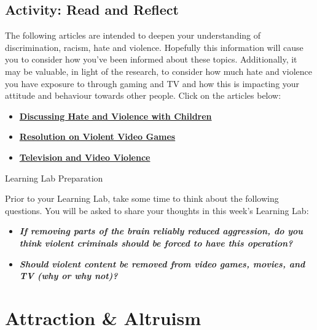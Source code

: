 \documentclass[
]{book}
\providecommand{\tightlist}{%
  \setlength{\itemsep}{0pt}\setlength{\parskip}{0pt}}
\begin{document}
\hypertarget{activity-read-and-reflect-9}{%
\subsection*{Activity: Read and Reflect}\label{activity-read-and-reflect-9}}

\begin{reflect}
The following articles are intended to deepen your understanding of discrimination, racism, hate and violence. Hopefully this information will cause you to consider how you've been informed about these topics. Additionally, it may be valuable, in light of the research, to consider how much hate and violence you have exposure to through gaming and TV and how this is impacting your attitude and behaviour towards other people. Click on the articles below:

\begin{itemize}
\tightlist
\item
  \href{https://www.adl.org/education/resources/tools-and-strategies/discussing-hate-and-violence-with-children}{\textbf{Discussing Hate and Violence with Children}}\\
\item
  \href{https://www.apa.org/about/policy/violent-video-games}{\textbf{Resolution on Violent Video Games}}\\
\item
  \href{https://www.apa.org/action/resources/research-in-action/protect}{\textbf{Television and Video Violence}}
\end{itemize}

{Learning Lab Preparation}

Prior to your Learning Lab, take some time to think about the following questions. You will be asked to share your thoughts in this week's Learning Lab:

\begin{itemize}
\tightlist
\item
  \textbf{\emph{If removing parts of the brain reliably reduced aggression, do you think violent criminals should be forced to have this operation?}}
\item
  \textbf{\emph{Should violent content be removed from video games, movies, and TV (why or why not)?}}
\end{itemize}
\end{reflect}

\hypertarget{attraction-altruism}{%
\section{Attraction \& Altruism}\label{attraction-altruism}}
\end{document}
